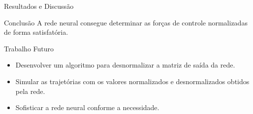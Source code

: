 \begin{frame}{Resultados e Discussão}
\begin{figure}[H]
    \centering

    \label{fig:comparison}
\end{figure}
\end{frame}

\begin{frame}{Conclusão}
A rede neural consegue determinar as forças de controle normalizadas de forma satisfatória.

\begin{block}{Trabalho Futuro}
\begin{itemize}
    \item Desenvolver um algoritmo para desnormalizar a matriz de saída da rede.
    \item Simular as trajetórias com os valores normalizados e desnormalizados obtidos pela rede.
    \item Sofisticar a rede neural conforme a necessidade.
\end{itemize}
\end{block}

\end{frame}